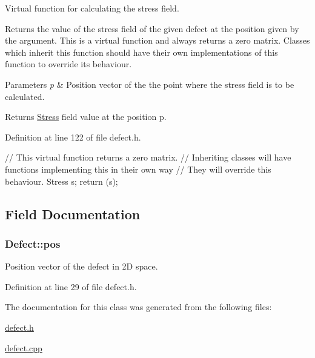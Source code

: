 \-Virtual function for calculating the stress field. 

\-Returns the value of the stress field of the given defect at the position given by the argument. \-This is a virtual function and always returns a zero matrix. \-Classes which inherit this function should have their own implementations of this function to override its behaviour. 
\begin{DoxyParams}{\-Parameters}
{\em p} & \-Position vector of the the point where the stress field is to be calculated. \\
\hline
\end{DoxyParams}
\begin{DoxyReturn}{\-Returns}
\hyperlink{classStress}{\-Stress} field value at the position p. 
\end{DoxyReturn}


\-Definition at line 122 of file defect.\-h.


\begin{DoxyCode}
  {
    // This virtual function returns a zero matrix.
    // Inheriting classes will have functions implementing this in their own
       way
    // They will override this behaviour.
    Stress s;
    return (s);
  }
\end{DoxyCode}


\subsection{\-Field \-Documentation}
\hypertarget{classDefect_aed2731c1beefc22e3db6ad5b18194cdd}{
\subsubsection[{pos}]{ {\bf \-Defect\-::pos}}}\label{d5/d4f/classDefect_aed2731c1beefc22e3db6ad5b18194cdd}


\-Position vector of the defect in 2\-D space. 



\-Definition at line 29 of file defect.\-h.



\-The documentation for this class was generated from the following files\-:\begin{DoxyCompactItemize}
\item 
\hyperlink{defect_8h}{defect.\-h}\item 
\hyperlink{defect_8cpp}{defect.\-cpp}\end{DoxyCompactItemize}
